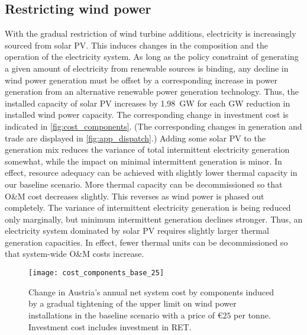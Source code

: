\documentclass[review, 3p, times, 12pt, authoryear]{elsarticle}
\begin{document}
    \subsection{Restricting wind power} \label{subsec:restricting-wind}
    With the gradual restriction of wind turbine additions, electricity is increasingly sourced from solar PV.
    This induces changes in the composition and the operation of the electricity system.
    As long as the policy constraint of generating a given amount of electricity from renewable sources is binding, any decline in wind power generation must be offset by a corresponding increase in power generation from an alternative renewable power generation technology.
    Thus, the installed capacity of solar PV increases by \SI{1.98}{\giga\watt} for each \si{\giga\watt} reduction in installed wind power capacity.
    The corresponding change in investment cost is indicated in \autoref{fig:cost_components}.
    (The corresponding changes in generation and trade are displayed in \autoref{fig:app_dispatch}.)
    Adding some solar PV to the generation mix reduces the variance of total intermittent electricity generation somewhat, while the impact on minimal intermittent generation is minor.
    In effect, resource adequacy can be achieved with slightly lower thermal capacity in our baseline scenario.
    More thermal capacity can be decommissioned so that O\&M cost decreases slightly.
    This reverses as wind power is phased out completely.
    The variance of intermittent electricity generation is being reduced only marginally, but minimum intermittent generation declines stronger.
    Thus, an electricity system dominated by solar PV requires slightly larger thermal generation capacities.
    In effect, fewer thermal units can be decommissioned so that system-wide O\&M costs increase.

    \begin{figure*}[ht]
        \centering
        \texttt{[image: cost\_components\_base\_25]}
        \caption{Change in Austria's annual net system cost by components induced by a gradual tightening of the upper limit on wind power installations in the baseline scenario with a  price of \euro$25$ per tonne. Investment cost includes investment in RET.}
        \label{fig:cost_components}
    \end{figure*}
\end{document}
